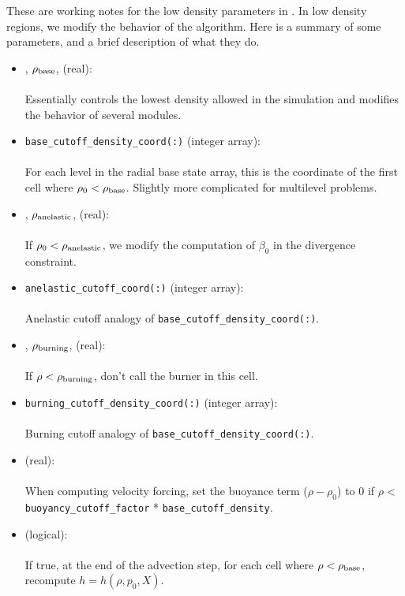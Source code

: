 These are working notes for the low density parameters in \maestro.
In low density regions, we modify the behavior of the algorithm.  Here
is a summary of some parameters, and a brief description of what they
do.
\begin{itemize}
\item {}, $\rho_{\rm base}$, (real):\\ \\
Essentially controls the lowest density allowed in the simulation and modifies the behavior
of several modules.
\item {\tt base\_cutoff\_density\_coord(:)} (integer array):\\ \\
For each level in the radial base state array, this is the coordinate of the first cell
where $\rho_0 < \rho_{\rm base}$.  Slightly more complicated for multilevel problems.

\item {}, $\rho_{\rm anelastic}$, (real):\\ \\
If $\rho_0 < \rho_{\rm anelastic}$, we modify the computation of $\beta_0$ in the
divergence constraint.

\item {\tt anelastic\_cutoff\_coord(:)} (integer array):\\ \\
Anelastic cutoff analogy of {\tt base\_cutoff\_density\_coord(:)}.

\item {}, $\rho_{\rm burning}$,  (real):\\ \\
If $\rho < \rho_{\rm burning}$, don't call the burner in this cell.

\item {\tt burning\_cutoff\_density\_coord(:)} (integer array):\\ \\
Burning cutoff analogy of {\tt base\_cutoff\_density\_coord(:)}.

\item {} (real):\\ \\
When computing velocity forcing, set the buoyance term ($\rho-\rho_0$) to 0 if 
$\rho < $ {\tt buoyancy\_cutoff\_factor} * {\tt base\_cutoff\_density}.

\item {} (logical):\\ \\
If {\rm true}, at the end of the advection step, for each cell where 
$\rho < \rho_{\rm base}$, recompute $h = h(\rho,p_0,X)$.
\end{itemize}

